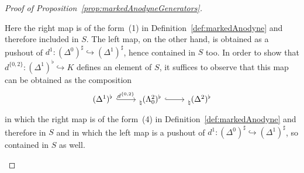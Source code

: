 \documentclass[reqno]{amsart}
\numberwithin{equation}{subsection}
\theoremstyle{plain}
\theoremstyle{definition}
\let\into=\hookrightarrow
\begin{document}
\begin{proof}[{Proof of Proposition~\ref{prop:markedAnodyneGenerators}}]
\begin{enumerate}[resume]
\begin{equation*}
	\end{equation*}
	Here the right map is of the form~(1) in Definition~\ref{def:markedAnodyne} and therefore included in $S$. The left map, on the other hand, is obtained as a pushout of $d^1\colon( \Delta^0)^\sharp\into (\Delta^1)^\sharp$, hence contained in $S$ too. In order to show that $d^{\{0,2\}}\colon (\Delta^1)^\flat\into K$ defines an element of $S$, it suffices to observe that this map can be obtained as the composition
	\begin{equation*}
	\begin{tikzcd}
	(\Delta^1)^\flat\arrow[r, hookrightarrow, "d^{\{0,2\}}"] & \prescript{}{\natural}(\Lambda^2_0)^\flat\arrow[r, hookrightarrow] & \prescript{}{\natural}(\Delta^2)^\flat
	\end{tikzcd}
	\end{equation*}
	in which the right map is of the form~(4) in Definition~\ref{def:markedAnodyne} and therefore in $S$ and in which the left map is a pushout of $d^1\colon (\Delta^0)^\sharp\into (\Delta^1)^\sharp$, so contained in $S$ as well.
	

\end{enumerate}
\end{proof}
\end{document}
